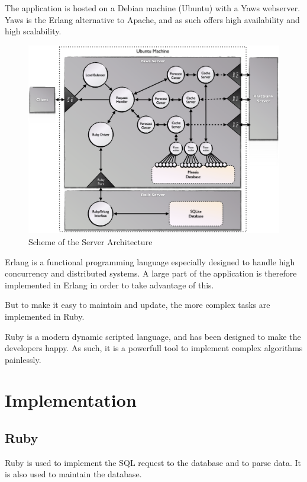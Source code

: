 The application is hosted on a Debian machine (Ubuntu) with a Yaws webserver. Yaws is the Erlang alternative to Apache, and as such offers high availability and high scalability.

\begin{figure}[ht]
\center
\includegraphics[scale=0.4]{pics/server_side}
\caption{Scheme of the Server Architecture}
\label{fig:server_architecture}
\end{figure}


Erlang is a functional programming language especially designed to handle high concurrency and distributed systems.  A large part of the application is therefore implemented in Erlang in order to take advantage of this.

But to make it easy to maintain and update, the more complex tasks are implemented in Ruby.

Ruby is a modern dynamic scripted language, and has been designed to make the developers happy. As such, it is a powerfull tool to implement complex algorithms painlessly.

\section{Implementation}

\subsection{Ruby}

Ruby is used to implement the SQL request to the database and to parse data. It is also used to maintain the database.

